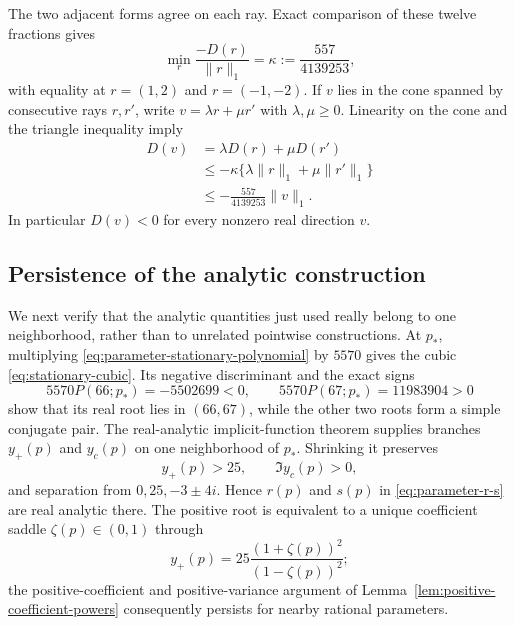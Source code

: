 \documentclass[11pt,reqno,letterpaper]{amsart}
\numberwithin{equation}{section}
\theoremstyle{definition}
\theoremstyle{remark}
\begin{document}
The two adjacent forms agree on each ray.  Exact comparison of these
twelve fractions gives
\begin{equation}\label{eq:exact-kappa}
 \min_r\frac{-D(r)}{\|r\|_1}
 =\kappa:=\frac{557}{4139253},
\end{equation}
with equality at \(r=(1,2)\) and \(r=(-1,-2)\).  If \(v\) lies in the
cone spanned by consecutive rays \(r,r'\), write
\(v=\lambda r+\mu r'\) with \(\lambda,\mu\geq0\).  Linearity on the
cone and the triangle inequality imply
\begin{equation}\label{eq:uniform-D-negative}
 \begin{split}
 D(v)&=\lambda D(r)+\mu D(r')\\
 &\leq-\kappa\{\lambda\|r\|_1+\mu\|r'\|_1\}\\
 &\leq-\frac{557}{4139253}\|v\|_1.
 \end{split}
\end{equation}
In particular \(D(v)<0\) for every nonzero real direction \(v\).

\subsection{Persistence of the analytic construction}

We next verify that the analytic quantities just used really belong to
one neighborhood, rather than to unrelated pointwise constructions.
At \(p_*\), multiplying \eqref{eq:parameter-stationary-polynomial} by
\(5570\) gives the cubic \eqref{eq:stationary-cubic}.  Its negative
discriminant and the exact signs
\[
 5570P(66;p_*)=-5502699<0,\qquad
 5570P(67;p_*)=11983904>0
\]
show that its real root lies in \((66,67)\), while the other two roots
form a simple conjugate pair.  The real-analytic implicit-function
theorem supplies branches \(y_+(p)\) and \(y_c(p)\) on one neighborhood
of \(p_*\).  Shrinking it preserves
\[
 y_+(p)>25,\qquad \Im y_c(p)>0,
\]
and separation from \(0,25,-3\pm4i\).  Hence \(r(p)\) and \(s(p)\) in
\eqref{eq:parameter-r-s} are real analytic there.  The positive root is
equivalent to a unique coefficient saddle \(\zeta(p)\in(0,1)\) through
\[
 y_+(p)=25\frac{(1+\zeta(p))^2}{(1-\zeta(p))^2};
\]
the positive-coefficient and positive-variance argument of
Lemma~\ref{lem:positive-coefficient-powers} consequently persists for
nearby rational parameters.
\end{document}
